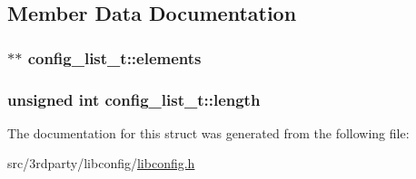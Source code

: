 \subsection{Member Data Documentation}
\hypertarget{structconfig__list__t_a8a0f0c428590f6630367748c0170c1ea}{
\subsubsection[{elements}]{$\ast$$\ast$ {\bf config\_\-list\_\-t::elements}}}
\label{structconfig__list__t_a8a0f0c428590f6630367748c0170c1ea}
\hypertarget{structconfig__list__t_a713729415280421d146ce4f590e33356}{
\subsubsection[{length}]{\setlength{\rightskip}{0pt plus 5cm}unsigned int {\bf config\_\-list\_\-t::length}}}
\label{structconfig__list__t_a713729415280421d146ce4f590e33356}


The documentation for this struct was generated from the following file:\begin{DoxyCompactItemize}
\item 
src/3rdparty/libconfig/\hyperlink{libconfig_8h}{libconfig.h}\end{DoxyCompactItemize}

